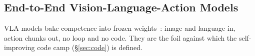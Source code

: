 \subsection{End-to-End Vision-Language-Action Models}
\label{sec:vla}

VLA models bake competence into frozen weights~\citep{openvla,pi0}: image and
language in, action chunks out, no loop and no code. They are the foil against which
the self-improving code camp (\S\ref{sec:code}) is defined.
